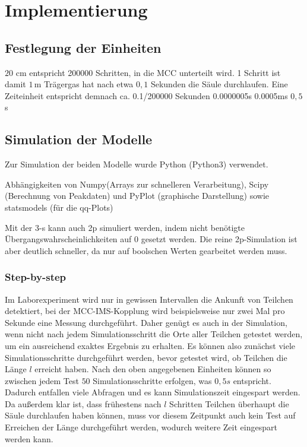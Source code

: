 
\chapter{Implementierung}
\label{chapter:imp}

\section{Festlegung der Einheiten}
$20$ cm entspricht 200000 Schritten, in die MCC unterteilt wird.
1 Schritt ist damit $1$\,\textmu m
Trägergas hat nach etwa $0,1$ Sekunden die Säule durchlaufen.
Eine Zeiteinheit entspricht demnach ca. 0.1/200000 Sekunden 0.0000005s 0.0005ms $0,5$\,\textmu s


\section{Simulation der Modelle}
Zur Simulation der beiden Modelle wurde Python (Python3) verwendet.

Abhängigkeiten von Numpy(Arrays zur schnelleren Verarbeitung), Scipy (Berechnung von Peakdaten) und PyPlot (graphische Darstellung) sowie statsmodels (für die qq-Plots)

Mit der 3-s kann auch 2p simuliert werden, indem nicht benötigte Übergangswahrscheinlichkeiten auf 0 gesetzt werden. Die reine 2p-Simulation ist aber deutlich schneller, da nur auf boolschen Werten gearbeitet werden muss.


\subsection{Step-by-step}

Im Laborexperiment wird nur in gewissen Intervallen die Ankunft von Teilchen detektiert, bei der MCC-IMS-Kopplung wird beispielsweise nur zwei Mal pro Sekunde eine Messung durchgeführt. Daher genügt es auch in der Simulation, wenn nicht nach jedem Simulationsschritt die Orte aller Teilchen getestet werden, um ein ausreichend exaktes Ergebnis zu erhalten.
Es können also zunächst viele Simulationsschritte durchgeführt werden, bevor getestet wird, ob Teilchen die Länge $l$ erreicht haben. Nach den oben angegebenen Einheiten können so zwischen jedem Test $50$ Simulationsschritte erfolgen, was $0,5 s$ entspricht. Dadurch entfallen viele Abfragen und es kann Simulationszeit eingespart werden. 
Da außerdem klar ist, dass frühestens nach $l$ Schritten Teilchen überhaupt die Säule durchlaufen haben können, muss vor diesem Zeitpunkt auch kein Test auf Erreichen der Länge durchgeführt werden, wodurch weitere Zeit eingespart werden kann.

